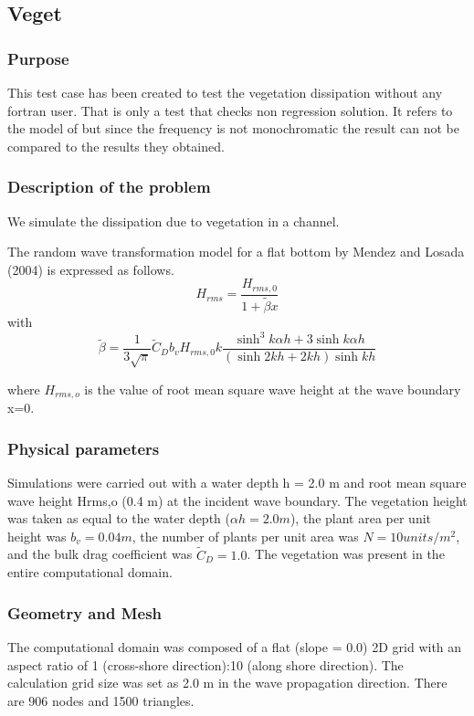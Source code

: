 \subsection{Veget}
%
%
\subsubsection{Purpose}
%
This test case has been created to test the vegetation dissipation without any fortran user. That is only a test that checks non regression solution. It refers to the model of \cite{mendez} but since the frequency is not monochromatic the result can not be compared to the results they obtained.

%
\subsubsection{Description of the problem}
%
We simulate the dissipation due to vegetation in a channel.

The random wave transformation model for a flat bottom by Mendez and Losada (2004) is expressed as follows.
$$
H_{rms}=\frac{H_{rms,0}}{1+\tilde{\beta}x}
$$
with
$$
\tilde{\beta}=\frac{1}{3\sqrt{\pi}}\tilde{C}_D b_v H_{rms,0}k \frac{\sinh^3 k\alpha h+3\sinh k\alpha h}{(\sinh2kh+2kh)\sinh kh}
$$

where $H_{rms,o}$ is the value of root mean square wave height at the wave boundary x=0.


\subsubsection{Physical parameters}
Simulations were carried out with a water depth h = 2.0 m and root mean square wave height Hrms,o (0.4 m) at the incident wave boundary. The vegetation height was taken as equal to the water depth ($\alpha h = 2.0 m$), the plant area per unit height was $b_v = 0.04 m$, the number of plants per unit area was $N = 10 units/m^2$, and the bulk drag coefficient was $\tilde{C}_D=1.0$. The vegetation was present in the entire computational domain.

\subsubsection{Geometry and Mesh}
%
The computational domain was composed of a flat (slope = 0.0) 2D grid with an aspect ratio of 1 (cross-shore direction):10 (along shore direction).
The calculation grid size was set as 2.0 m in the wave propagation direction. There are 906 nodes
and 1500 triangles.


